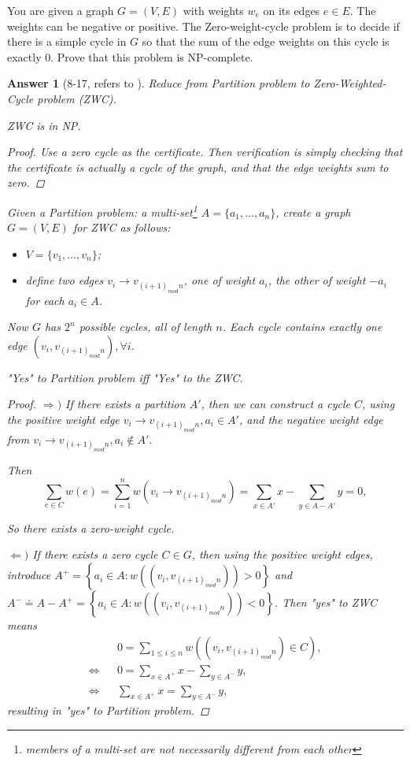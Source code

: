 \documentclass[11pt]{article}
\theoremstyle{numberplain}
\theoremstyle{nonumberplain}
\newtheorem{proof}{Proof}
\newtheorem{ans}{Answer}
\newcommand{\0}{{\mathbf{0}}}
\begin{document}
\begin{ques}[8-17]
You are given a graph $G=(V,E)$
with weights $w_e$ on its edges $e \in E$. The weights can be negative
or positive. The {\sc Zero-weight-cycle} problem is to decide if there
is a simple cycle in $G$ so that the sum of the
edge weights on this cycle is exactly $0$.
Prove that this problem is NP-complete.
\end{ques}
\begin{ans}[8-17, refers to \cite{noahluckeasterly}]
Reduce from Partition problem to Zero-Weighted-Cycle problem (ZWC).

\begin{State}[Claim 1]ZWC is in NP.
\end{State}
\begin{proof}    Use a zero cycle as the certificate.  Then verification is simply checking that
    the certificate is actually a cycle of the graph, and that the edge weights
    sum to zero.
\end{proof}
Given a Partition problem: a multi-set\footnote{members of a multi-set are not necessarily different from each other} $A=\{a_1,\ldots,a_n\}$, create a graph $G = (V,E)$ for ZWC as follows:
\begin{itemize}
\item $V= \{v_1,\ldots, v_n\}$;
\item define two edges $v_i\rightarrow v_{(i+1)_{mod} n}$, one
      of weight $a_i$, the other of weight $-a_i$ for each $a_i\in A$.
\end{itemize}
    Now $G$ has $2^n$ possible cycles, all of length $n$.  Each cycle contains exactly
    one edge $(v_i, v_{(i+1)_{ mod} n}),\forall i$.
\begin{State}[Claim 2]	"Yes" to Partition problem iff "Yes" to the ZWC.
\end{State}
\begin{proof}
$\Rightarrow )$ If there exists a partition $A'$, then we can construct a cycle
    $C$, using the positive weight edge $v_i\rightarrow v_{(i+1)_{mod }n},a_i \in A'$,
    and the negative weight edge from $v_i\rightarrow v_{(i+1)_{mod }n},a_i \notin A'$.

    Then 
    $$\sum_{e \in C} w(e)= \sum_{i=1}^n w\left( v_i\rightarrow v_{(i+1)_{mod }n}\right)
                   = \sum_{x \in A'} x - \sum_{y \in A - A'} y=0,$$

    So there exists a zero-weight cycle.

$\Leftarrow )$ If there exists a zero cycle $C\in G$, then using the positive weight
		edges, introduce $A^+ = \left\{ a_i\in A : w\left( (v_i, v_{(i+1)_{mod} n})\right) > 0 \right\}$ 	
 and $A^-\doteq A - A^+ =  \left\{ a_i\in A : w\left( (v_i, v_{(i+1)_{mod} n})\right) < 0 \right\}$.
Then "yes" to ZWC means
\begin{eqnarray*}
&& 0 = \sum_{1 \leq  i \leq n} w( (v_i, v_{(i+1)_{ mod} n}) \in C ), \\
\Leftrightarrow && 0 = \sum_{x \in A^+} x - \sum_{y \in A^-} y, \\
\Leftrightarrow && \sum_{x \in A^+} x = \sum_{y \in A^-} y,
\end{eqnarray*}    
resulting in "yes" to Partition problem.
\end{proof}
\end{ans}
\end{document}
